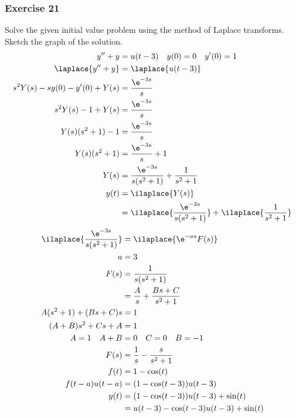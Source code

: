 \documentclass{math}
\begin{document}
\subsubsection*{Exercise 21}
Solve the given initial value problem using the method of Laplace transforms.
Sketch the graph of the solution.
\begin{align*}
  y''+y &= u(t-3) \quad y(0) = 0 \quad y'(0) = 1 \\
  \laplace{y''+y} &= \laplace{u(t-3)} \\
  s^2Y(s)-sy(0)-y'(0)+Y(s) &= \frac{\e^{-3s}}{s} \\
  s^2Y(s)-1+Y(s) &= \frac{\e^{-3s}}{s} \\
  Y(s)(s^2+1)-1 &= \frac{\e^{-3s}}{s} \\
  Y(s)(s^2+1) &= \frac{\e^{-3s}}{s}+1 \\
  Y(s) &= \frac{\e^{-3s}}{s(s^2+1)}+\frac{1}{s^2+1} \\
  y(t) &= \ilaplace{Y(s)} \\
  &= \ilaplace{\frac{\e^{-3s}}{s(s^2+1)}}+\ilaplace{\frac{1}{s^2+1}}
\end{align*}
\begin{align*}
  \ilaplace{\frac{\e^{-3s}}{s(s^2+1)}} &= \ilaplace{\e^{-as}F(s)} \\
  a &= 3 \\
  F(s) &= \frac{1}{s(s^2+1)} \\
  &= \frac{A}{s}+\frac{Bs+C}{s^2+1} \\
  A(s^2+1)+(Bs+C)s &= 1 \\
  (A+B)s^2+Cs+A &= 1 \\
  A = 1 \quad A+B &= 0 \quad C = 0 \quad B = -1 \\
  F(s) &= \frac{1}{s}-\frac{s}{s^2+1} \\
  f(t) &= 1-\cos(t) \\
  f(t-a)u(t-a) &= (1-\cos(t-3))u(t-3) \\
  y(t) &= (1-\cos(t-3))u(t-3)+\sin(t) \\
  &= u(t-3)-\cos(t-3)u(t-3)+\sin(t)
\end{align*}
\end{document}
